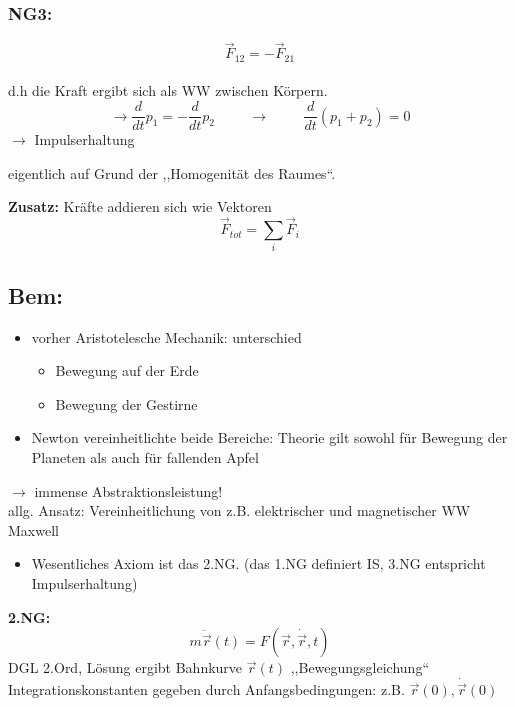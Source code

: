 \documentclass[titlepage,12pt,a4paper,ngerman]{report}
\begin{document}
\subsubsection{NG3:} $$\vec{F}_{12}=-\vec{F}_{21}$$\\
d.h die Kraft ergibt sich als WW zwischen Körpern.\\
$$\rightarrow \frac{d}{dt} p_{1}=-\frac{d}{dt}p_{2} \hspace{1cm} \rightarrow \hspace{1cm} \frac{d}{dt}(p_{1}+p_{2}) =0$$
$\rightarrow$ Impulserhaltung\par
eigentlich auf Grund der ,,Homogenität des Raumes``.\par
\textbf{Zusatz:} Kräfte addieren sich wie Vektoren\\
$$ \vec{F}_{tot} = \sum_{i} \vec{F}_{i}$$
\subsection{Bem:} 
\begin{itemize}
	\item vorher Aristotelesche Mechanik: unterschied
	\begin{itemize}
		\item Bewegung auf der Erde
		\item Bewegung der Gestirne
	\end{itemize}
	\item Newton vereinheitlichte beide Bereiche: Theorie gilt sowohl für Bewegung der Planeten als auch für fallenden Apfel
\end{itemize}
$\rightarrow$ immense Abstraktionsleistung!\\
allg. Ansatz: Vereinheitlichung von z.B. elektrischer und magnetischer WW Maxwell
\begin{itemize}
	\item Wesentliches Axiom ist das 2.NG. (das 1.NG definiert IS, 3.NG entspricht Impulserhaltung)
\end{itemize}
\textbf{2.NG:} 
$$m\ddot{\vec{r}}(t) = F(\vec{r},\dot{\vec{r}}, t)$$
DGL 2.Ord, Lösung ergibt Bahnkurve $\vec{r}(t)$ ,,Bewegungsgleichung``\\
Integrationskonstanten gegeben durch Anfangsbedingungen: z.B. $\vec{r}(0) , \dot{\vec{r}}(0)$\par
\end{document}
